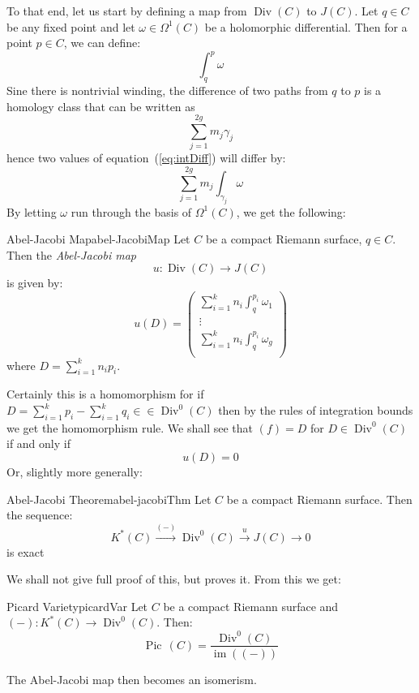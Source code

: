 \documentclass{book}
\newcommand{\im}{{\operatorname{im}}}
\newcommand{\Div}{{\operatorname{Div}}}
\newcommand{\Pic}{{\operatorname{Pic}\,}}
\begin{document}
To that end, let us start by defining a map from $\Div(C)$ to $J(C)$. Let $q \in C$ be any fixed point and let $\omega
\in \Omega^1(C)$ be a holomorphic differential. Then for a point $p \in C$, we can define:
\begin{equation}\label{eq:intDiff}
  \int_q^p \omega
\end{equation}
Sine there is nontrivial winding, the difference of two paths from $q$ to $p$ is a homology class that can be
written as
\[
  \sum_{j=1}^{2g} m_j\gamma_j
\]
hence two values of equation~(\ref{eq:intDiff}) will differ by:
\[
  \sum_{j=1}^{2g} m_j \int_{\gamma_j} \omega
\]
By letting $\omega$ run through the basis of $\Omega^1(C)$, we get the following:
\begin{defn}{Abel-Jacobi Map}{abel-JacobiMap}
  Let $C$ be a compact Riemann surface, $q \in C$. Then the \emph{Abel-Jacobi map}
  \[
    u: \Div(C) \to J(C)
  \]
  is given by:
  \[
    u(D) = \begin{pmatrix}
      \sum_{i=1}^k n_i \int_q^{p_i} \omega_1\\
    \vdots\\
    \sum_{i=1}^k n_i \int_q^{p_i}\omega_g\\
    \end{pmatrix}
  \]
  where $D = \sum_{i=1}^k n_ip_i$.
\end{defn}

Certainly this is a homomorphism for if $D = \sum_{i=1}^k p_i - \sum_{i=1}^k q_i \in \in \Div^0(C)$ then by
the rules of integration bounds we get the homomorphism rule. We shall see that $(f) = D$ for $D \in
\Div^0(C)$ if and only if
\[
  u(D) = 0
\]
Or, slightly more generally:
\begin{thm}{Abel-Jacobi Theorem}{abel-jacobiThm}
  Let $C$ be a compact Riemann surface. Then the sequence:
  \[
  K^*(C) \xrightarrow{(-)} \Div^0(C) \xrightarrow{u} J(C) \to 0
  \]
  is exact
\end{thm}

We shall not give full proof of this, but \cite{a.griffithsIntroductionAlgebraicCurves} proves it. From this we get:

\begin{defn}{Picard Variety}{picardVar}
  Let $C$ be a compact Riemann surface and $(-): K^*(C) \to \Div^0(C)$. Then:
  \[
    \Pic(C) = \frac{\Div^0(C)}{\im \left((-)\right)}
  \]
\end{defn}
The Abel-Jacobi map then becomes an isomerism.
\end{document}

